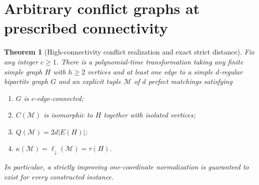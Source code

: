 \documentclass[10pt]{article}
\newtheorem{theorem}{Theorem}[section]
\newcommand{\M}{\mathcal M}
\begin{document}
\section{Arbitrary conflict graphs at prescribed connectivity}
\begin{theorem}[High-connectivity conflict realization and exact strict distance]\label{thm:main}
Fix any integer $c\ge1$. There is a polynomial-time transformation taking any finite simple graph $H$ with $h\ge2$ vertices and at least one edge to a simple $d$-regular bipartite graph $G$ and an explicit tuple $\M$ of $d$ perfect matchings satisfying
\begin{enumerate}
\item $G$ is $c$-edge-connected;
\item $C(\M)$ is isomorphic to $H$ together with isolated vertices;
\item $Q(\M)=2d|E(H)|$;
\item $\displaystyle \kappa(\M)=\ell_\downarrow(\M)=\tau(H)$.
\end{enumerate}
In particular, a strictly improving one-coordinate normalization is guaranteed to exist for every constructed instance.
\end{theorem}
\end{document}
